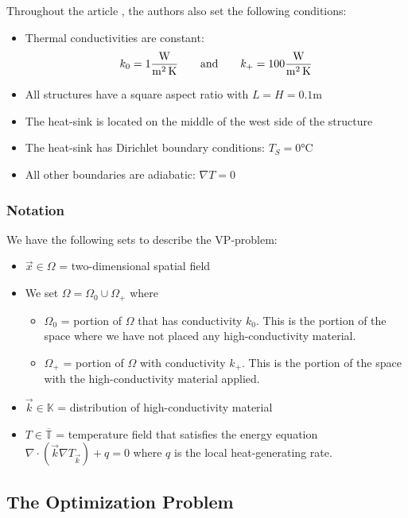 Throughout the article \cite[]{Marck2012}, the authors also set the following conditions:
\begin{itemize}
	\item Thermal conductivities are constant:
	$$k_0=1 \si[per-mode=fraction]{\watt\per\square\meter\per\kelvin}\qquad\text{and}\qquad k_+=100 \si[per-mode=fraction]{\watt\per\square\meter\per\kelvin}$$
	\item All structures have a square aspect ratio with $L=H=0.1\si{\meter}$
	\item The heat-sink is located on the middle of the west side of the structure
	\item The heat-sink has Dirichlet boundary conditions: $T_S=0\si{\celsius}$
	\item All other boundaries are adiabatic: $\nabla T=0$
\end{itemize}

\subsubsection*{Notation}

We have the following sets to describe the VP-problem:
\begin{itemize}
	\item $\vec{x}\in\Omega$ = two-dimensional spatial field
	\item[] We set $\Omega = \Omega_0\cup\Omega_+$ where
	\begin{itemize}
		\item $\Omega_0$ = portion of $\Omega$ that has conductivity $k_0$. This is the portion of the space where we have not placed any high-conductivity material.
		\item $\Omega_+$ = portion of $\Omega$ with conductivity $k_+$. This is the portion of the space with the high-conductivity material applied.
	\end{itemize}
	\item $\vec{k}\in\mathbb{K}$ = distribution of high-conductivity material
	\item $T\in\overline{\mathbb{T}}$ = temperature field that satisfies the energy equation $\nabla\cdot\left(\vec{k}\nabla T_{\vec{k}}\right)+q=0$ where $q$ is the local heat-generating rate.
\end{itemize}

\subsection{The Optimization Problem}


